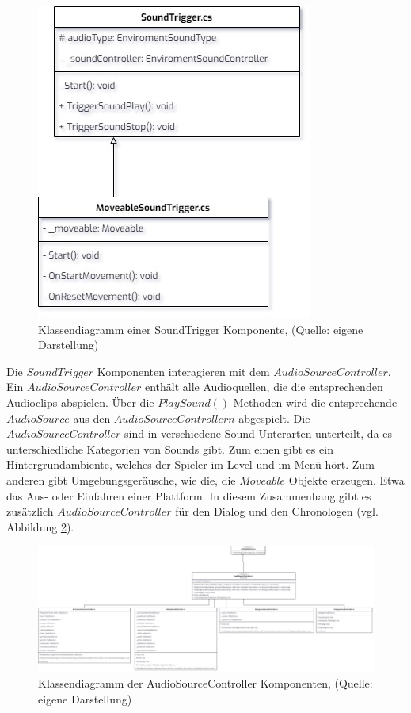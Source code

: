 \begin{figure}[ht]
\centering
\includegraphics[width=0.5\linewidth]{content/pictures/SoundTrigger.jpg}
\caption{Klassendiagramm einer SoundTrigger Komponente, (Quelle: eigene Darstellung)}
\label{fig:sound-trigger}
\end{figure}

Die $SoundTrigger$ Komponenten interagieren mit dem $AudioSourceController$. Ein $AudioSourceController$ enthält alle Audioquellen, die die entsprechenden Audioclips abspielen. Über die $PlaySound()$ Methoden wird die entsprechende $AudioSource$ aus den $AudioSourceControllern$ abgespielt. Die $AudioSourceController$ sind in verschiedene Sound Unterarten unterteilt, da es unterschiedliche Kategorien von Sounds gibt. Zum einen gibt es ein Hintergrundambiente, welches der Spieler im Level und im Menü hört. Zum anderen gibt Umgebungsgeräusche, wie die, die $Moveable$ Objekte erzeugen. Etwa das Aus- oder Einfahren einer Plattform. 
In diesem Zusammenhang gibt es zusätzlich $AudioSourceController$ für den Dialog und den Chronologen (vgl. Abbildung \ref{fig:audio-source-controller}). 

\begin{figure}[ht]
\centering
\includegraphics[width=1\linewidth]{content/pictures/AudioSourceController.jpg}
\caption{Klassendiagramm der AudioSourceController Komponenten, (Quelle: eigene Darstellung)}
\label{fig:audio-source-controller}
\end{figure}

